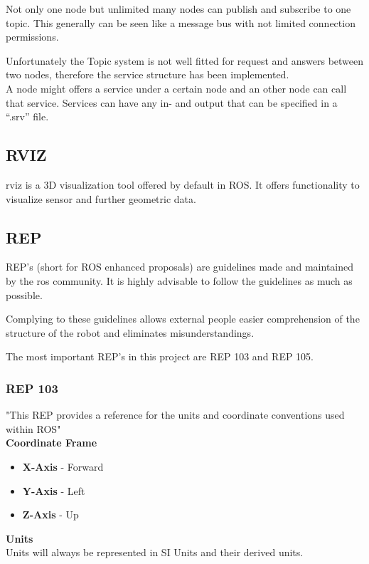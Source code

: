 Not only one node but unlimited many nodes can publish and subscribe to one topic. This generally can be seen like a message bus with not limited connection permissions\cite{rosconcepts}.

Unfortunately the Topic system is not well fitted for request and answers between two nodes, therefore the service structure has been implemented.\\ 
A node might offers a service under a certain node and an other node can call that service. Services can have any in- and output that can be specified in a ``.srv'' file\cite{rosconcepts}.

\subsection{RVIZ}
rviz is a 3D visualization tool offered by default in ROS. It offers functionality to visualize sensor and further geometric data.\\
\subsection{REP}
REP's (short for ROS enhanced proposals) are guidelines made and maintained by the ros community. It is highly advisable to follow the guidelines as much as possible.

Complying to these guidelines allows external people easier comprehension of the structure of the robot and eliminates misunderstandings.

The most important REP's in this project are REP 103 and REP 105.
\subsubsection{REP 103}
	
	"This REP provides a reference for the units and coordinate conventions used within ROS"\cite{REP103}\\  
	
	\textbf{Coordinate Frame}
	\begin{itemize}
		\item \textbf{X-Axis} - Forward
		\item \textbf{Y-Axis} - Left
		\item \textbf{Z-Axis} - Up
	\end{itemize}
	
	\textbf{Units}\\
	Units will always be represented in SI Units and their derived units.\\
	
